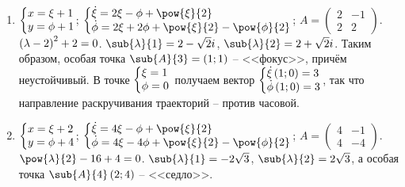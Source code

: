 \documentclass[a5paper,10pt]{article}
\begin{document}
\begin{enumerate}
    $A - \sub{\lambda}{1} E \sim \begin{pmatrix} 2 - \sqrt{6} & 1 \end{pmatrix}$,
    $\sub{v}{1} = \begin{pmatrix} 1 \\ -2 + \sqrt{6} \end{pmatrix}$.
    
    $A - \sub{\lambda}{2} E \sim \begin{pmatrix} 2 + \sqrt{6} & 1 \end{pmatrix}$,
    $\sub{v}{2} = \begin{pmatrix} 1 \\ -2 - \sqrt{6} \end{pmatrix}$.
    
    $\sub{\phi}{1} = \br{-2 + \sqrt{6}} \xi$ 
    и $\sub{\phi}{2} = \br{-2 - \sqrt{6}} \xi$ -- сепаратрисы.
    
    \item $\tsys{x = \xi + 1 \\ y = \phi + 1}$;
    $\tsys{
        \dot{\xi} = 2\xi - \phi + \pow{\xi}{2} \\
        \dot{\phi} = 2\xi + 2\phi + \pow{\xi}{2} - \pow{\phi}{2}
    }$;
    $A = \begin{pmatrix} 2 & -1 \\ 2 & 2 \end{pmatrix}$.
    $\left(\hspace{0.01em}\lambda - 2\hspace{0.01em}\right)^2 + 2 = 0$.
    $\sub{\lambda}{1} = 2 - \sqrt{2}i$,
    $\sub{\lambda}{2} = 2 + \sqrt{2}i$.
    Таким образом, особая точка $\sub{A}{3} = \br{1; 1}$ -- <<фокус>>, причём неустойчивый.
    В точке $\tsys{\xi = 1 \\ \phi = 0}$ получаем вектор 
    $\tsys{\dot{\xi}\br{1; 0} = 3 \\ \dot{\phi}\br{1; 0} = 3}$,
    так что направление раскручивания траекторий -- против часовой.
    
    \item $\tsys{x = \xi + 2 \\ y = \phi + 4}$;
    $\tsys{
        \dot{\xi} = 4\xi - \phi + \pow{\xi}{2} \\
        \dot{\phi} = 4\xi - 4\phi + \pow{\xi}{2} - \pow{\phi}{2}
    }$;
    $A = \begin{pmatrix} 4 & -1 \\ 4 & -4 \end{pmatrix}$.
    $\pow{\lambda}{2} - 16 + 4 = 0$.
    $\sub{\lambda}{1} = -2\sqrt{3}$, $\sub{\lambda}{2} = 2\sqrt{3}$,
    а особая точка $\sub{A}{4}\br{2;  4}$ -- <<седло>>.
    

\end{enumerate}
\end{document}
